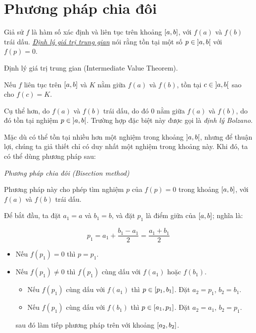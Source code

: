 \documentclass[../../Lectures.tex]{subfiles}
\begin{document}
\section{Phương pháp chia đôi}

Giả sử \(f\) là hàm số xác định và liên tục trên khoảng \(\interval{a}{b}\), với
\(f(a)\) và \(f(b)\) trái dấu.
\emph{\hyperref[thm:intermediate_value_theorem]{Định lý giá trị trung gian}} nói
rằng tồn tại một số \(p \in \interval[open]{a}{b}\) với \(f(p) = 0\).

\begin{theorem}\label{thm:intermediate_value_theorem}
    Định lý giá trị trung gian (Intermediate Value Theorem).

    Nếu \(f\) liên tục trên \(\interval{a}{b}\) và \(K\) nằm giữa \(f(a)\) và
    \(f(b)\), tồn tại \(c \in \interval[open]{a}{b}\) sao cho \(f(c) = K\).
\end{theorem}

Cụ thể hơn, do \(f(a)\) và \(f(b)\) trái dấu, do đó \(0\) nằm giữa \(f(a)\) và
\(f(b)\), do đó tồn tại nghiệm \(p \in \interval[open]{a}{b}\). Trường hợp đặc
biệt này được gọi là \emph{định lý Bolzano}.

Mặc dù có thể tồn tại nhiều hơn một nghiệm trong khoảng
\(\interval[open]{a}{b}\), nhưng để thuận lợi, chúng ta giả thiết chỉ có duy
nhất một nghiệm trong khoảng này. Khi đó, ta có thể dùng phương pháp sau:

\begin{method}
\emph{Phương pháp chia đôi (Bisection method)}

Phương pháp này cho phép tìm nghiệm \(p\) của \(f(p) = 0\) trong khoảng
\(\interval{a}{b}\), với \(f(a)\) và \(f(b)\) trái dấu.

Để bắt đầu, ta đặt \(a_1 = a\) và \(b_1 = b\), và đặt \(p_1\) là điểm giữa của
\(\interval{a}{b}\); nghĩa là:

\[p_1 = a_1 + \frac{b_1 - a_1}{2} = \frac{a_1 + b_1}{2}\]

\begin{itemize}
    \item Nếu \(f(p_1) = 0\) thì \(p = p_1\).
    \item Nếu \(f(p_1) \neq 0\) thì \(f(p_1)\) cùng dấu với \(f(a_1)\) hoặc \(f(b_1)\).
        \begin{itemize}
            \item Nếu \(f(p_1)\) cùng dấu với \(f(a_1)\) thì \(p \in
                \interval{p_1}{b_1}\). Đặt \(a_2 = p_1\), \(b_2 = b_1\).
            \item Nếu \(f(p_1)\) cùng dấu với \(f(b_1)\) thì \(p \in
                \interval{a_1}{p_1}\). Đặt \(a_2 = a_1\), \(b_2 = p_1\).
        \end{itemize}
        sau đó làm tiếp phương pháp trên với khoảng \(\interval{a_2}{b_2}\).
\end{itemize}
\end{method}
\end{document}
